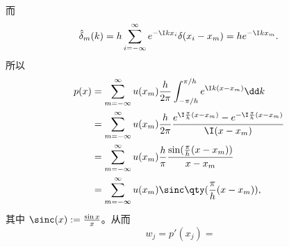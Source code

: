 而
\begin{equation}
\begin{aligned}
\hat\delta_m(k)=h\sum_{i=-\infty}^{\infty}e^{-\I kx_i}\delta(x_i-x_m)=he^{-\I kx_m}.
\end{aligned}~
\end{equation}
所以
\begin{equation}
\begin{aligned}
p(x)&=\sum\limits_{m=-\infty}^\infty u(x_m)\frac{h}{2\pi}\int_{-\pi/h}^{\pi/h} e^{\I k(x-x_m)}\dd k\\
&=\sum\limits_{m=-\infty}^\infty u(x_m)\frac{h}{2\pi}\frac{e^{\I \frac{\pi}{h}(x-x_m)}-e^{-\I \frac{\pi}{h}(x-x_m)}}{\I (x-x_m)}\\
&=\sum\limits_{m=-\infty}^\infty u(x_m)\frac{h}{\pi}\frac{\sin(\frac{\pi}{h}(x-x_m))}{x-x_m}\\
&=\sum\limits_{m=-\infty}^\infty u(x_m)\sinc \qty(\frac{\pi}{h}(x-x_m)),
\end{aligned}~
\end{equation}
其中 $\sinc(x):=\frac{\sin x}{x}$。从而
\begin{equation}
w_j=p'(x_j)=
\end{equation}








































